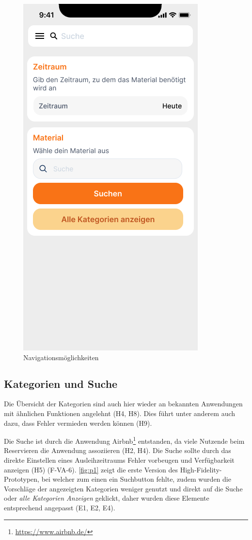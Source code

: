 \begin{figure}[h]
    \includegraphics[scale=0.4]{Bilder/Prototyp/Neu/Suche V2.png}
    \caption[-]{Navigationsmöglichkeiten}
    \label{fig:nav}
\end{figure}

\subsection{Kategorien und Suche}
Die Übersicht der Kategorien sind auch hier wieder an bekannten Anwendungen mit ähnlichen Funktionen
angelehnt (H4, H8). Dies führt unter anderem auch dazu, dass Fehler vermieden werden können (H9).

Die Suche ist durch die Anwendung Airbnb\footnote{\url{https://www.airbnb.de/}} entstanden, da viele
Nutzende beim Reservieren die Anwendung assoziieren (H2, H4). Die Suche sollte durch das direkte
Einstellen eines Ausleihzeitraums Fehler vorbeugen und Verfügbarkeit anzeigen (H5) (F-VA-6).
\ref{fig:p1} zeigt die erste Version des High-Fidelity-Prototypen, bei welcher zum einen ein
Suchbutton fehlte, zudem wurden die Vorschläge der angezeigten Kategorien weniger genutzt und
direkt auf die Suche oder \textit{alle Kategorien Anzeigen} geklickt, daher wurden diese
Elemente entsprechend angepasst (E1, E2, E4).

